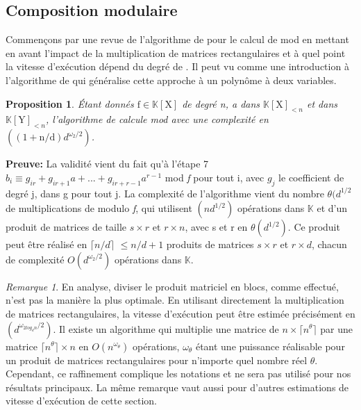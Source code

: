 \documentclass[a4paper]{article}
\begin{document}
\subsection{Composition modulaire}
Commençons par une revue de l'algorithme de  pour le calcul de   mod  en mettant en avant l'impact de la multiplication de matrices rectangulaires et à quel point la vitesse d'exécution dépend du degré de . Il peut  vu comme une introduction à l'algorithme de  qui généralise cette approche à un polynôme  à deux variables.
\theoremstyle{proposition}
\newtheorem*{pp}{Proposition}
\begin{pp} 
Étant donnés $\text{f}\in\mathbb{K}[\mathrm{X}]$ de degré n, a dans $\mathbb{K}[\mathrm{X}]_{<n}$ et  dans $\mathbb{K}[\mathrm{Y}]_{<n}$, l'algorithme de  calcule   mod  avec une complexité en $((1+\text{n/d})d^{\omega_{2}/2})$.
\end{pp}
\textbf{Preuve:} La validité vient du fait qu'à l'étape 7 $b_{i}\equiv g_{ir} + g_{ir+1}a + ... + g_{ir+r-1}a^{r-1}$ mod \textit{f} pour tout i, avec $g_{j}$ le coefficient de degré j, dans g pour tout j. La complexité de l'algorithme vient du nombre $\theta(d^{1/2}$ de multiplications de modulo \textit{f}, qui utilisent $(nd^{1/2})$ opérations dans $\mathbb{K}$ et d'un produit de matrices de taille $s\times r$ et $r\times n$, avec s et r en $\theta(d^{1/2})$. Ce produit peut être réalisé en $\lceil n/d \rceil$ $\leqslant n/d + 1$ produits de matrices $s\times r$ et $r\times d$, chacun de complexité $O(d^{\omega_{2}/2})$ opérations dans $\mathbb{K}$.
\theoremstyle{remark}
\newtheorem*{rem}{Remarque}
\begin{rem}
En analyse, diviser le produit matriciel en blocs, comme effectué, n'est pas la manière la plus optimale. En utilisant directement la multiplication de matrices rectangulaires, la vitesse d'exécution peut être estimée précisément en $(d^{\omega_{2log_{d}n}/2})$. Il existe un algorithme qui multiplie une matrice de $n\times \lceil n^{\theta} \rceil$ par une matrice $\lceil n^{\theta} \rceil\times n$ en $O(n^{\omega_{\theta}})$ opérations, $\omega_{\theta}$ étant une puissance réalisable pour un produit de matrices rectangulaires pour n'importe quel nombre réel $\theta$. Cependant, ce raffinement complique les notations et ne sera pas utilisé pour nos résultats principaux. La même remarque vaut aussi pour d'autres estimations de vitesse d'exécution de cette section.
\end{rem}
\end{document}
